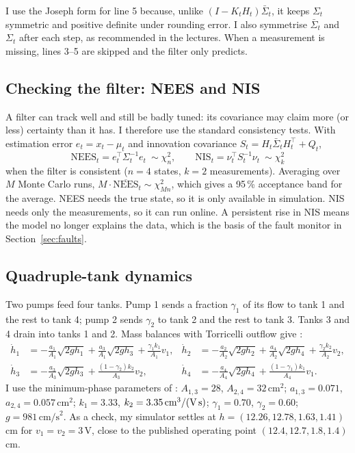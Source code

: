 \documentclass[11pt]{article}
\begin{document}
I use the Joseph form for line 5 because, unlike $(I-K_tH_t)\bar\Sigma_t$, it keeps $\Sigma_t$ symmetric and positive definite under rounding error. I also symmetrise $\bar\Sigma_t$ and $\Sigma_t$ after each step, as recommended in the lectures. When a measurement is missing, lines 3--5 are skipped and the filter only predicts.

\subsection{Checking the filter: NEES and NIS}
A filter can track well and still be badly tuned: its covariance may claim more (or less) certainty than it has. I therefore use the standard consistency tests. With estimation error $e_t=x_t-\mu_t$ and innovation covariance $S_t=H_t\bar\Sigma_tH_t^\top+Q_t$,
\begin{equation}
\text{NEES}_t=e_t^\top\Sigma_t^{-1}e_t\ \sim\chi^2_n,\qquad \text{NIS}_t=\nu_t^\top S_t^{-1}\nu_t\ \sim\chi^2_k
\end{equation}
when the filter is consistent ($n=4$ states, $k=2$ measurements). Averaging over $M$ Monte Carlo runs, $M\cdot\overline{\text{NEES}}_t\sim\chi^2_{Mn}$, which gives a 95\,\% acceptance band for the average. NEES needs the true state, so it is only available in simulation. NIS needs only the measurements, so it can run online. A persistent rise in NIS means the model no longer explains the data, which is the basis of the fault monitor in Section~\ref{sec:faults}.

\subsection{Quadruple-tank dynamics}
Two pumps feed four tanks. Pump 1 sends a fraction $\gamma_1$ of its flow to tank 1 and the rest to tank 4; pump 2 sends $\gamma_2$ to tank 2 and the rest to tank 3. Tanks 3 and 4 drain into tanks 1 and 2. Mass balances with Torricelli outflow give \cite{johansson2000}:
\begin{equation}
\begin{aligned}
\dot h_1&=-\tfrac{a_1}{A_1}\sqrt{2gh_1}+\tfrac{a_3}{A_1}\sqrt{2gh_3}+\tfrac{\gamma_1k_1}{A_1}v_1, &
\dot h_2&=-\tfrac{a_2}{A_2}\sqrt{2gh_2}+\tfrac{a_4}{A_2}\sqrt{2gh_4}+\tfrac{\gamma_2k_2}{A_2}v_2,\\
\dot h_3&=-\tfrac{a_3}{A_3}\sqrt{2gh_3}+\tfrac{(1-\gamma_2)k_2}{A_3}v_2, &
\dot h_4&=-\tfrac{a_4}{A_4}\sqrt{2gh_4}+\tfrac{(1-\gamma_1)k_1}{A_4}v_1 .
\end{aligned}
\end{equation}
I use the minimum-phase parameters of \cite{johansson2000}: $A_{1,3}=28$, $A_{2,4}=32\,\text{cm}^2$; $a_{1,3}=0.071$, $a_{2,4}=0.057\,\text{cm}^2$; $k_1=3.33$, $k_2=3.35\,\text{cm}^3/(\text{V\,s})$; $\gamma_1=0.70$, $\gamma_2=0.60$; $g=981\,\text{cm/s}^2$. As a check, my simulator settles at $h=(12.26,12.78,1.63,1.41)$\,cm for $v_1=v_2=3$\,V, close to the published operating point $(12.4,12.7,1.8,1.4)$\,cm.
\end{document}
